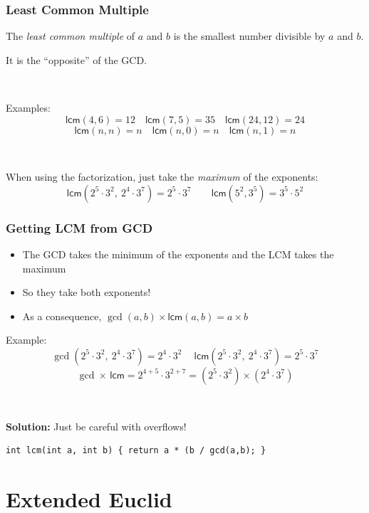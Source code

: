 \documentclass[12pt]{beamer}
\begin{document}
\newcommand{\lcm}{\mathsf{lcm}}

\begin{frame}
\frametitle{Least Common Multiple}
The \emph{least common multiple} of $a$ and $b$ is the smallest number divisible by $a$ and $b$.

It is the ``opposite'' of the GCD.

~

Examples:
\[\lcm(4,6) = 12 \quad \lcm(7,5) = 35 \quad \lcm(24,12)=24\]
\[\lcm(n,n) = n \quad \lcm(n,0) = n \quad \lcm(n,1) = n\]

~

When using the factorization, just take the \emph{maximum} of the exponents:
\[\lcm(2^5\cdot3^2,\ 2^4\cdot3^7) = 2^5\cdot3^7 \qquad \lcm(5^2, 3^5) = 3^5\cdot5^2\]
\end{frame}

\begin{frame}[fragile]
\frametitle{Getting LCM from GCD}
\begin{itemize}
\item The GCD takes the minimum of the exponents and the LCM takes the maximum
\item So they take both exponents!
\item As a consequence, $\gcd(a,b) \times \lcm(a,b) = a \times b$
\end{itemize}

Example:
\[\gcd(2^5\cdot3^2,\ 2^4\cdot3^7) = 2^4\cdot3^2 \quad\ \lcm(2^5\cdot3^2,\ 2^4\cdot3^7) = 2^5\cdot3^7\]
\[\gcd\times\,\lcm = 2^{4+5}\cdot3^{2+7} = (2^5\cdot3^2) \times (2^4\cdot3^7)\]

~

\textbf{Solution:} Just be careful with overflows!
\begin{lstlisting}
int lcm(int a, int b) { return a * (b / gcd(a,b); }
\end{lstlisting}
\end{frame}

\section{Extended Euclid}

\newcommand{\di}{\,|\,}
\end{document}
